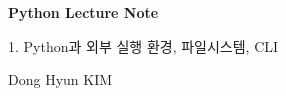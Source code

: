\documentclass[a4paper,11pt]{article}
\begin{document}

\begin{titlepage}
    \centering
    \vspace*{\fill}

    {\Huge\bfseries Python Lecture Note\par}

    \vspace{1cm}

    {\Large 1. Python과 외부 실행 환경, 파일시스템, CLI\par}

    \vspace{0.5cm}

    {\large Dong Hyun KIM\par}

    \vspace*{\fill}
\end{titlepage}



\end{document}
